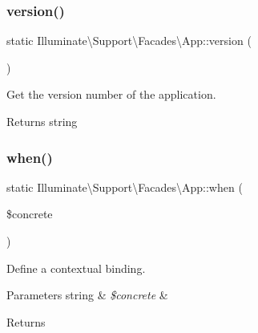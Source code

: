 \subsubsection{\texorpdfstring{version()}{version()}}
{\footnotesize\ttfamily static Illuminate\textbackslash{}\+Support\textbackslash{}\+Facades\textbackslash{}\+App\+::version (\begin{DoxyParamCaption}{ }\end{DoxyParamCaption})\hspace{0.3cm}{\ttfamily [static]}}

Get the version number of the application.

\begin{DoxyReturn}{Returns}
string 
\end{DoxyReturn}
\mbox{\label{class_illuminate_1_1_support_1_1_facades_1_1_app_a9255963e97fbfb9128c9dd66e60c0d36}} 
\subsubsection{\texorpdfstring{when()}{when()}}
{\footnotesize\ttfamily static Illuminate\textbackslash{}\+Support\textbackslash{}\+Facades\textbackslash{}\+App\+::when (\begin{DoxyParamCaption}\item[{}]{\$concrete }\end{DoxyParamCaption})\hspace{0.3cm}{\ttfamily [static]}}

Define a contextual binding.


\begin{DoxyParams}[1]{Parameters}
string & {\em \$concrete} & \\
\hline
\end{DoxyParams}
\begin{DoxyReturn}{Returns}

\end{DoxyReturn}
\mbox{\label{class_illuminate_1_1_support_1_1_facades_1_1_app_a02a59d234efa1d1ca364e08584a14d34}} 
